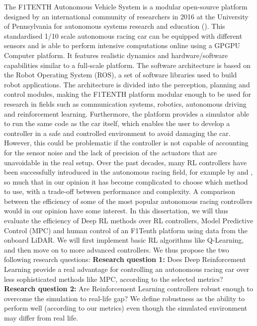 The F1TENTH Autonomous Vehicle System is a modular open-source platform designed by an international community of researchers in 2016 at the University of Pennsylvania for autonomous systems research and education (\cite{okelly2019}). This standardised 1/10 scale autonomous racing car can be equipped with different sensors and is able to perform intensive computations online using a GPGPU Computer platform. It features realistic dynamics and hardware/software capabilities similar to a full-scale platform. The software architecture is based on the Robot Operating System (ROS), a set of software libraries used to build robot applications. The architecture is divided into the perception, planning and control modules, making the F1TENTH  platform modular enough to be used for research in fields such as communication systems, robotics, autonomous driving and reinforcement learning. Furthermore, the platform provides a simulator able to run the same code as the car itself, which enables the user to develop a controller in a safe and controlled environment to avoid damaging the car. However, this could be problematic if the controller is not capable of accounting for the sensor noise and the lack of precision of the actuators that are unavoidable in the real setup.
	\newline
Over the past decades, many RL controllers have been successfully introduced in the autonomous racing field, for example by \cite{sim2real} and \cite{granturismo}, so much that in our opinion it has become complicated to choose which method to use, with a trade-off between performance and complexity. A comparison between the efficiency of some of the most popular autonomous racing controllers would in our opinion have some interest. In this dissertation, we will thus evaluate the efficiency of Deep RL methods over RL controllers, Model Predictive Control (MPC) and human control of an F1Tenth platform using data from the onboard LiDAR. We will first implement basic RL algorithms like Q-Learning, and then move on to more advanced controllers. We thus propose the two following research questions:
\newline
\textbf{Research question 1:} Does Deep Reinforcement Learning provide a real advantage for controlling an autonomous racing car over less sophisticated methods like MPC, according to the selected metrics?
\newline
\textbf{Research question 2:} Are Reinforcement Learning controllers robust enough to overcome the simulation to real-life gap? We define robustness as the ability to perform well (according to our metrics) even though the simulated environment may differ from real life.
